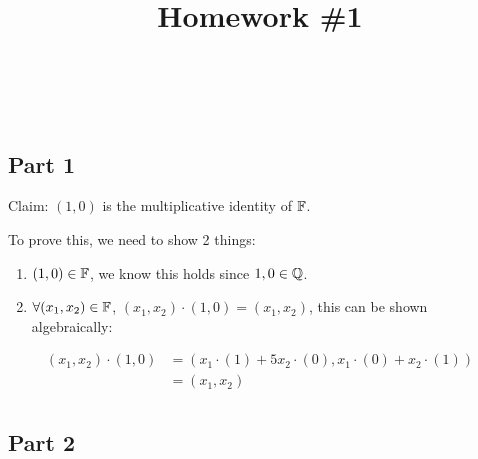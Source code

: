 \documentclass[12pt]{article} %
\title{
    \vspace{2in}
        \textmd{\textbf{\classTitle}}\\
    \vspace{1in}
    \textmd{\textbf{Homework \#1}}\\
    \vspace{1in}
}
\author{
    \hmwkAuthorName\\
    \hmwkStudentnum\\
}
\date{}
\begin{document}
\maketitle

\pagebreak

\begin{homeworkProblem}


    \subsection*{Part 1}

    Claim: $(1, 0)$ is the multiplicative identity of $\mathbb{F}$.

    To prove this, we need to show 2 things:

    \begin{enumerate}
        \item $(1, 0) \in \mathbb{F}$, we know this holds since $1, 0 \in \mathbb{Q}$.
        \item $\forall (x_1, x_2) \in \mathbb{F}$,  $(x_1, x_2) \cdot (1, 0) = (x_1, x_2)$, this can be shown algebraically:
    \end{enumerate}


    \begin{align*}
        (x_1, x_2) \cdot (1, 0)
         & = (x_1 \cdot (1) + 5x_2 \cdot (0), x_1 \cdot (0) + x_2 \cdot (1)) \\
         & = (x_1, x_2)                                                      \\
    \end{align*}

    \subsection*{Part 2}


\end{homeworkProblem}
\end{document}
